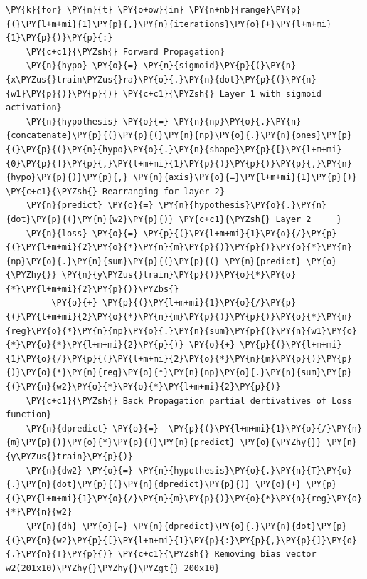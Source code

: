 \documentclass[a4paper,11pt]{article}%
\begin{document}
    \begin{tcolorbox}[breakable, size=fbox, boxrule=1pt, pad at break*=1mm,colback=cellbackground, colframe=cellborder]
\begin{Verbatim}[commandchars=\\\{\}]
\PY{k}{for} \PY{n}{t} \PY{o+ow}{in} \PY{n+nb}{range}\PY{p}{(}\PY{l+m+mi}{1}\PY{p}{,}\PY{n}{iterations}\PY{o}{+}\PY{l+m+mi}{1}\PY{p}{)}\PY{p}{:}
    \PY{c+c1}{\PYZsh{} Forward Propagation}
    \PY{n}{hypo} \PY{o}{=} \PY{n}{sigmoid}\PY{p}{(}\PY{n}{x\PYZus{}train\PYZus{}ra}\PY{o}{.}\PY{n}{dot}\PY{p}{(}\PY{n}{w1}\PY{p}{)}\PY{p}{)} \PY{c+c1}{\PYZsh{} Layer 1 with sigmoid activation}
    \PY{n}{hypothesis} \PY{o}{=} \PY{n}{np}\PY{o}{.}\PY{n}{concatenate}\PY{p}{(}\PY{p}{(}\PY{n}{np}\PY{o}{.}\PY{n}{ones}\PY{p}{(}\PY{p}{(}\PY{n}{hypo}\PY{o}{.}\PY{n}{shape}\PY{p}{[}\PY{l+m+mi}{0}\PY{p}{]}\PY{p}{,}\PY{l+m+mi}{1}\PY{p}{)}\PY{p}{)}\PY{p}{,}\PY{n}{hypo}\PY{p}{)}\PY{p}{,} \PY{n}{axis}\PY{o}{=}\PY{l+m+mi}{1}\PY{p}{)} \PY{c+c1}{\PYZsh{} Rearranging for layer 2}
    \PY{n}{predict} \PY{o}{=} \PY{n}{hypothesis}\PY{o}{.}\PY{n}{dot}\PY{p}{(}\PY{n}{w2}\PY{p}{)} \PY{c+c1}{\PYZsh{} Layer 2     }
    \PY{n}{loss} \PY{o}{=} \PY{p}{(}\PY{l+m+mi}{1}\PY{o}{/}\PY{p}{(}\PY{l+m+mi}{2}\PY{o}{*}\PY{n}{m}\PY{p}{)}\PY{p}{)}\PY{o}{*}\PY{n}{np}\PY{o}{.}\PY{n}{sum}\PY{p}{(}\PY{p}{(} \PY{n}{predict} \PY{o}{\PYZhy{}} \PY{n}{y\PYZus{}train}\PY{p}{)}\PY{o}{*}\PY{o}{*}\PY{l+m+mi}{2}\PY{p}{)}\PYZbs{}
         \PY{o}{+} \PY{p}{(}\PY{l+m+mi}{1}\PY{o}{/}\PY{p}{(}\PY{l+m+mi}{2}\PY{o}{*}\PY{n}{m}\PY{p}{)}\PY{p}{)}\PY{o}{*}\PY{n}{reg}\PY{o}{*}\PY{n}{np}\PY{o}{.}\PY{n}{sum}\PY{p}{(}\PY{n}{w1}\PY{o}{*}\PY{o}{*}\PY{l+m+mi}{2}\PY{p}{)} \PY{o}{+} \PY{p}{(}\PY{l+m+mi}{1}\PY{o}{/}\PY{p}{(}\PY{l+m+mi}{2}\PY{o}{*}\PY{n}{m}\PY{p}{)}\PY{p}{)}\PY{o}{*}\PY{n}{reg}\PY{o}{*}\PY{n}{np}\PY{o}{.}\PY{n}{sum}\PY{p}{(}\PY{n}{w2}\PY{o}{*}\PY{o}{*}\PY{l+m+mi}{2}\PY{p}{)}
    \PY{c+c1}{\PYZsh{} Back Propagation partial dertivatives of Loss function}
    \PY{n}{dpredict} \PY{o}{=}  \PY{p}{(}\PY{l+m+mi}{1}\PY{o}{/}\PY{n}{m}\PY{p}{)}\PY{o}{*}\PY{p}{(}\PY{n}{predict} \PY{o}{\PYZhy{}} \PY{n}{y\PYZus{}train}\PY{p}{)}
    \PY{n}{dw2} \PY{o}{=} \PY{n}{hypothesis}\PY{o}{.}\PY{n}{T}\PY{o}{.}\PY{n}{dot}\PY{p}{(}\PY{n}{dpredict}\PY{p}{)} \PY{o}{+} \PY{p}{(}\PY{l+m+mi}{1}\PY{o}{/}\PY{n}{m}\PY{p}{)}\PY{o}{*}\PY{n}{reg}\PY{o}{*}\PY{n}{w2}
    \PY{n}{dh} \PY{o}{=} \PY{n}{dpredict}\PY{o}{.}\PY{n}{dot}\PY{p}{(}\PY{n}{w2}\PY{p}{[}\PY{l+m+mi}{1}\PY{p}{:}\PY{p}{,}\PY{p}{]}\PY{o}{.}\PY{n}{T}\PY{p}{)} \PY{c+c1}{\PYZsh{} Removing bias vector w2(201x10)\PYZhy{}\PYZhy{}\PYZgt{} 200x10}

\end{Verbatim}
\end{tcolorbox}
\end{document}
